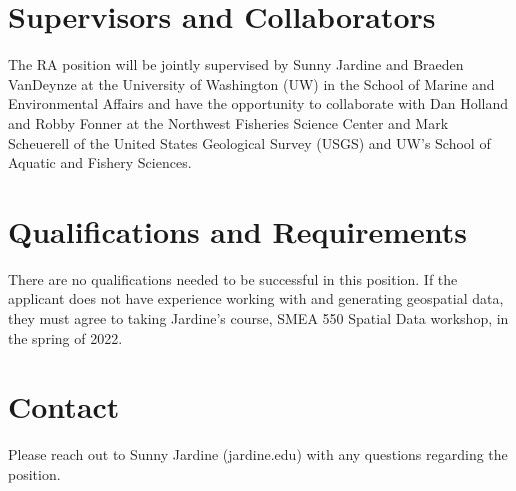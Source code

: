 \documentclass[12pt]{elsarticle}
\begin{document}
\section*{Supervisors and Collaborators}
			
The RA position will be jointly supervised by Sunny Jardine and Braeden VanDeynze at the University of Washington (UW) in the School of Marine and Environmental Affairs and have the opportunity to collaborate with Dan Holland and Robby Fonner at the Northwest Fisheries Science Center and Mark Scheuerell of the United States Geological Survey (USGS) and UW's School of Aquatic and Fishery Sciences.


\section*{Qualifications and Requirements}
There are no qualifications needed to be successful in this position. If the applicant does not have experience working with and generating geospatial data, they must agree to taking Jardine's course, SMEA 550 Spatial Data workshop, in the spring of 2022.
			
\section*{Contact}
\noindent Please reach out to Sunny Jardine (jardine\@uw.edu) with any questions regarding the position.
			
\end{document}
